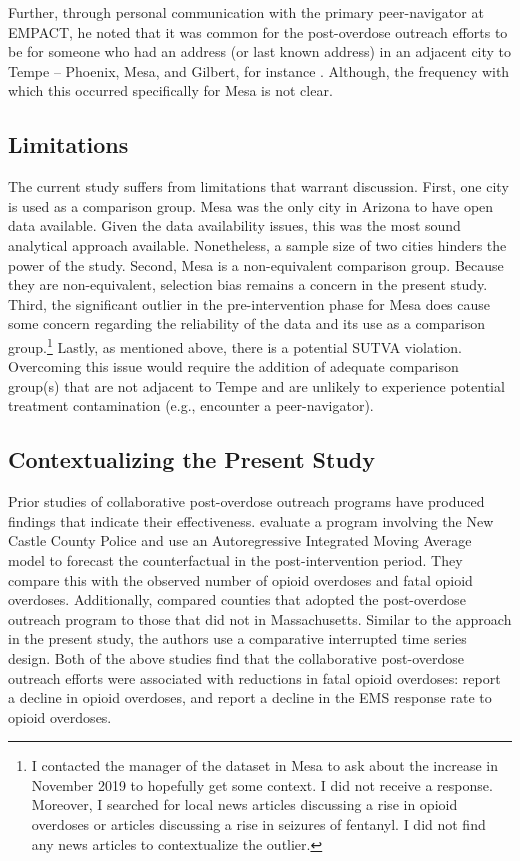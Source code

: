 Further, through personal communication with the primary peer-navigator at EMPACT, he noted that it was common for the post-overdose outreach efforts to be for someone who had an address (or last known address) in an adjacent city to Tempe -- Phoenix, Mesa, and Gilbert, for instance \parencite{watts_personal_2024}. Although, the frequency with which this occurred specifically for Mesa is not clear.

\subsection{Limitations}
The current study suffers from limitations that warrant discussion. First, one city is used as a comparison group. Mesa was the only city in Arizona to have open data available. Given the data availability issues, this was the most sound analytical approach available. Nonetheless, a sample size of two cities hinders the power of the study. Second, Mesa is a non-equivalent comparison group. Because they are non-equivalent, selection bias remains a concern in the present study. Third, the significant outlier in the pre-intervention phase for Mesa does cause some concern regarding the reliability of the data and its use as a comparison group.\footnote{I contacted the manager of the dataset in Mesa to ask about the increase in November 2019 to hopefully get some context. I did not receive a response. Moreover, I searched for local news articles discussing a rise in opioid overdoses or articles discussing a rise in seizures of fentanyl. I did not find any news articles to contextualize the outlier.} Lastly, as mentioned above, there is a potential SUTVA violation. Overcoming this issue would require the addition of adequate comparison group(s) that are not adjacent to Tempe and are unlikely to experience potential treatment contamination (e.g., encounter a peer-navigator).

\subsection{Contextualizing the Present Study}

Prior studies of collaborative post-overdose outreach programs have produced findings that indicate their effectiveness. \textcite{donnelly_law_2022} evaluate a program involving the New Castle County Police and use an Autoregressive Integrated Moving Average model to forecast the counterfactual in the post-intervention period. They compare this with the observed number of opioid overdoses and fatal opioid overdoses. Additionally, \textcite{xuan_association_2023} compared counties that adopted the post-overdose outreach program to those that did not in Massachusetts. Similar to the approach in the present study, the authors use a comparative interrupted time series design. Both of the above studies find that the collaborative post-overdose outreach efforts were associated with reductions in fatal opioid overdoses: \textcite{donnelly_law_2022} report a decline in opioid overdoses, and \textcite{xuan_association_2023} report a decline in the EMS response rate to opioid overdoses. 


